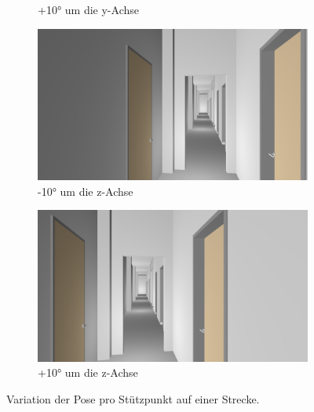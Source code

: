 \begin{figure}
\begin{subfigure}[t]{0.18\linewidth}
		\caption{+10° um die y-Achse}
		\label{subfig:iz0_y+10}
	\end{subfigure}
	\hfill
	\begin{subfigure}[t]{0.18\linewidth}
		\centering
		\includegraphics[width=\linewidth]{images/syn_dataset/00024.png}
		\caption{-10° um die z-Achse}
		\label{subfig:iz-10_y0}
	\end{subfigure}
	\hfill
	\begin{subfigure}[t]{0.18\linewidth}
		\centering
		\includegraphics[width=\linewidth]{images/syn_dataset/00022.png}
		\caption{+10° um die z-Achse}
		\label{subfig:iz+10_y0}
	\end{subfigure}
	\caption{Variation der Pose pro Stützpunkt auf einer Strecke.}
	\label{fig:dataset_variation}
\end{figure}


